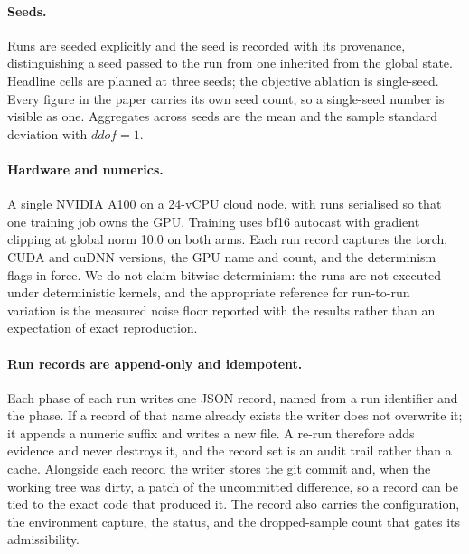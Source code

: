 \paragraph{Seeds.}
Runs are seeded explicitly and the seed is recorded with its provenance,
distinguishing a seed passed to the run from one inherited from the global
state. Headline cells are planned at three seeds; the objective ablation is
single-seed. Every figure in the paper carries its own seed count, so a
single-seed number is visible as one. Aggregates across seeds are the mean and
the sample standard deviation with $ddof = 1$.

\paragraph{Hardware and numerics.}
A single NVIDIA A100 on a 24-vCPU cloud node, with runs serialised so that one
training job owns the GPU. Training uses bf16 autocast with gradient clipping at
global norm 10.0 on both arms. Each run record captures the torch, CUDA and
cuDNN versions, the GPU name and count, and the determinism flags in force.
We do not claim bitwise determinism: the runs are not executed under
deterministic kernels, and the appropriate reference for run-to-run variation is
the measured noise floor reported with the results rather than an expectation of
exact reproduction.

\paragraph{Run records are append-only and idempotent.}
Each phase of each run writes one JSON record, named from a run identifier and
the phase. If a record of that name already exists the writer does not overwrite
it; it appends a numeric suffix and writes a new file. A re-run therefore adds
evidence and never destroys it, and the record set is an audit trail rather than
a cache. Alongside each record the writer stores the git commit and, when the
working tree was dirty, a patch of the uncommitted difference, so a record can
be tied to the exact code that produced it. The record also carries the
configuration, the environment capture, the status, and the dropped-sample
count that gates its admissibility.

